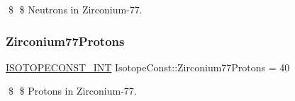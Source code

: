 \$ \$ Neutrons in Zirconium-\/77. \mbox{\label{group___isotope_const-_zirconium-_zr77_ga3f0651857111c200cc27e4b6ee9337a8}} 
\subsubsection{\texorpdfstring{Zirconium77\+Protons}{Zirconium77Protons}}
{\footnotesize\ttfamily \mbox{\hyperlink{group___isotope_const-_macros_ga5f18360b3e99483a35c32d789e62621c}{I\+S\+O\+T\+O\+P\+E\+C\+O\+N\+S\+T\+\_\+\+I\+NT}} Isotope\+Const\+::\+Zirconium77\+Protons = 40}

\$ \$ Protons in Zirconium-\/77. 
